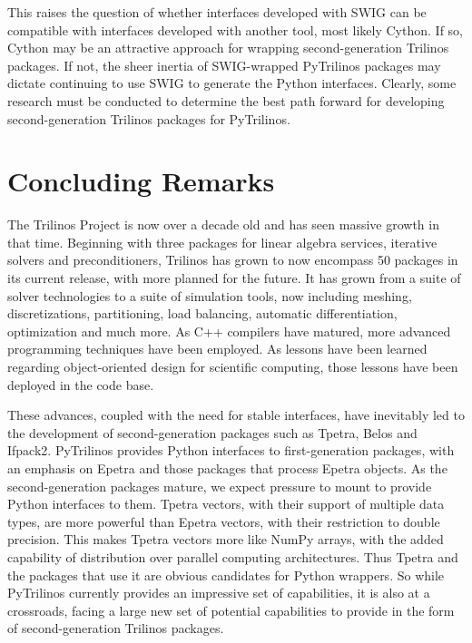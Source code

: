 \documentclass[11pt]{article}
\begin{document}
This raises the question of whether interfaces developed with SWIG can be compatible with interfaces developed with another tool, most likely Cython.  If so, Cython may be an attractive approach for wrapping second-generation Trilinos packages.  If not, the sheer inertia of SWIG-wrapped PyTrilinos packages may dictate continuing to use SWIG to generate the Python interfaces.  Clearly, some research must be conducted to determine the best path forward for developing second-generation Trilinos packages for PyTrilinos.

\section{Concluding Remarks}
\label{sec:concluding remarks}

The Trilinos Project is now over a decade old and has seen massive growth in that time.  Beginning with three packages for linear algebra services, iterative solvers and preconditioners, Trilinos has grown to now encompass 50 packages in its current release, with more planned for the future.  It has grown from a suite of solver technologies to a suite of simulation tools, now including meshing, discretizations, partitioning, load balancing, automatic differentiation, optimization and much more.  As C++ compilers have matured, more advanced programming techniques have been employed.  As lessons have been learned regarding object-oriented design for scientific computing, those lessons have been deployed in the code base.

These advances, coupled with the need for stable interfaces, have inevitably led to the development of second-generation packages such as Tpetra, Belos and Ifpack2.  PyTrilinos provides Python interfaces to first-generation packages, with an emphasis on Epetra and those packages that process Epetra objects.  As the second-generation packages mature, we expect pressure to mount to provide Python interfaces to them.  Tpetra vectors, with their support of multiple data types, are more powerful than Epetra vectors, with their restriction to double precision.  This makes Tpetra vectors more like NumPy arrays, with the added capability of distribution over parallel computing architectures.  Thus Tpetra and the packages that use it are obvious candidates for Python wrappers.  So while PyTrilinos currently provides an impressive set of capabilities, it is also at a crossroads, facing a large new set of potential capabilities to provide in the form of second-generation Trilinos packages.



\end{document}
